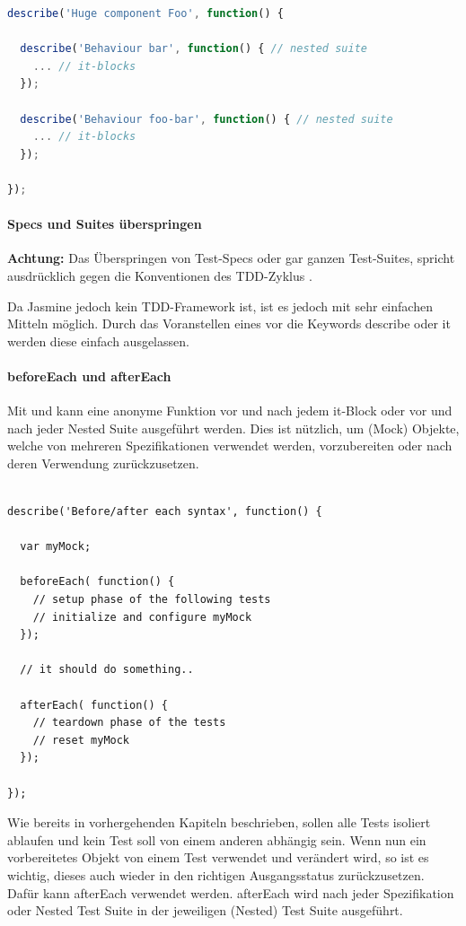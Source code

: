 \begin{lstlisting}[language=JavaScript]
describe('Huge component Foo', function() {

  describe('Behaviour bar', function() { // nested suite
    ... // it-blocks
  });

  describe('Behaviour foo-bar', function() { // nested suite
    ... // it-blocks
  });

});
\end{lstlisting}

\paragraph{Specs und Suites überspringen}
\textbf{Achtung:} Das Überspringen von Test-Specs oder gar ganzen Test-Suites, spricht ausdrücklich gegen die Konventionen des TDD-Zyklus \autocite{Beck:2003}.

Da Jasmine jedoch kein TDD-Framework ist, ist es jedoch mit sehr einfachen Mitteln möglich. Durch das Voranstellen eines  vor die Keywords describe oder it werden diese einfach ausgelassen.

\paragraph{beforeEach und afterEach}

Mit  und  kann eine anonyme Funktion vor und nach jedem it-Block oder vor und nach jeder Nested Suite ausgeführt werden. Dies ist nützlich, um (Mock) Objekte, welche von mehreren Spezifikationen verwendet werden, vorzubereiten oder nach deren Verwendung zurückzusetzen.

\begin{lstlisting}

describe('Before/after each syntax', function() {

  var myMock;

  beforeEach( function() {
    // setup phase of the following tests
    // initialize and configure myMock
  });

  // it should do something..

  afterEach( function() {
    // teardown phase of the tests
    // reset myMock
  });

});

\end{lstlisting}

Wie bereits in vorhergehenden Kapiteln beschrieben, sollen alle Tests isoliert ablaufen und kein Test soll von einem anderen abhängig sein. Wenn nun ein vorbereitetes Objekt von einem Test verwendet und verändert wird, so ist es wichtig, dieses auch wieder in den richtigen Ausgangsstatus zurückzusetzen. Dafür kann afterEach verwendet werden. afterEach wird nach jeder Spezifikation oder Nested Test Suite in der jeweiligen (Nested) Test Suite ausgeführt.

